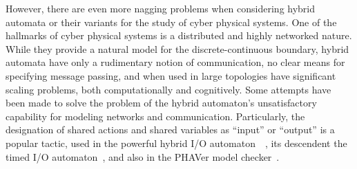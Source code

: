 However, there are even more nagging problems when considering hybrid automata or their variants
for the study of cyber physical systems. One of the hallmarks of cyber physical systems is a
distributed and highly networked nature. While they provide a
natural model for the discrete-continuous boundary, hybrid automata have only a rudimentary
notion of communication, no clear means for specifying message passing, and when used in large
topologies have significant scaling problems, both computationally and cognitively.
Some attempts have been made to solve the problem of the hybrid automaton's unsatisfactory
capability for modeling networks and communication. Particularly, the designation of shared
actions and shared variables as ``input'' or ``output'' is a popular tactic, used in the
powerful hybrid I/O automaton~\cite{lynch1996hybrid}~\cite{lynch2001hybrid}, its descendent the
timed I/O automaton~\cite{kaynar2010theory}, and also in the PHAVer model 
checker~\cite{frehse2005phaver}.

